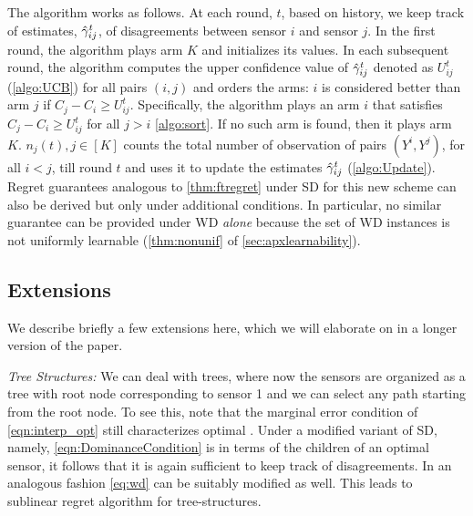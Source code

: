 The algorithm works as follows. At each round, $t$, based on history, we keep track of estimates, $\hat{\gamma}^t_{ij}$, of disagreements between sensor $i$ and sensor $j$.  %
In the first round, the algorithm plays arm $K$ and initializes its values. In each subsequent round, the algorithm computes the upper confidence value of $\hat{\gamma}^t_{ij}$ denoted as $U^t_{ij}$ (\ref{algo:UCB}) for all pairs $(i,j)$ and orders the arms: $i$ is considered better than arm $j$ if $C_j-C_i \geq U^t_{ij}$. Specifically, the algorithm plays an arm $i$ that satisfies $C_j-C_i \geq U^t_{ij}$ for all $j>i$ \ref{algo:sort}. If no such arm is found, then it plays arm $K$.  $n_j(t), j\in [K] $ counts the total number of observation of pairs $(Y^i, Y^j)$, for all $i<j$, till round $t$ and uses it to update the estimates $\hat{\gamma}_{ij}^t$ (\ref{algo:Update}). Regret guarantees analogous to \cref{thm:ftregret} under SD for this new scheme can also be derived but only under additional conditions. In particular, no similar guarantee can be provided under WD \emph{alone} because the set of WD instances is not uniformly learnable (\cref{thm:nonunif} of \cref{sec:apxlearnability}). 
\vspace{-5pt}
%
\subsection{Extensions} 
We describe briefly a few extensions here, which we will elaborate on in a longer version of the paper.

\noindent
{\it Tree Structures:}
We can deal with trees, where now the sensors are organized as a tree with root node corresponding to sensor 1 and we can select any path starting from the root node. To see this, note that the marginal error condition of \cref{eqn:interp_opt} still characterizes optimal \ses. Under a modified variant of SD, namely, \cref{eqn:DominanceCondition} is in terms of the children of an optimal sensor, it follows that it is again sufficient to keep track of disagreements. In an analogous fashion \cref{eq:wd} can be suitably modified as well. This leads to sublinear regret algorithm for tree-structures. %

